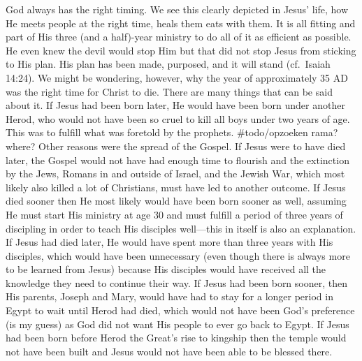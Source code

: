 God always has the right timing. We see this clearly depicted in Jesus'
life, how He meets people at the right time, heals them eats with them.
It is all fitting and part of His three (and a half)-year ministry to do
all of it as efficient as possible. He even knew the devil would stop
Him but that did not stop Jesus from sticking to His plan. His plan has
been made, purposed, and it will stand (cf.~Isaiah 14:24). We might be
wondering, however, why the year of approximately 35 AD was the right
time for Christ to die. There are many things that can be said about it.
If Jesus had been born later, He would have been born under another
Herod, who would not have been so cruel to kill all boys under two years
of age. This was to fulfill what was foretold by the prophets.
\#todo/opzoeken rama? where? Other reasons were the spread of the
Gospel. If Jesus were to have died later, the Gospel would not have had
enough time to flourish and the extinction by the Jews, Romans in and
outside of Israel, and the Jewish War, which most likely also killed a
lot of Christians, must have led to another outcome. If Jesus died
sooner then He most likely would have been born sooner as well, assuming
He must start His ministry at age 30 and must fulfill a period of three
years of discipling in order to teach His disciples well---this in
itself is also an explanation. If Jesus had died later, He would have
spent more than three years with His disciples, which would have been
unnecessary (even though there is always more to be learned from Jesus)
because His disciples would have received all the knowledge they need to
continue their way. If Jesus had been born sooner, then His parents,
Joseph and Mary, would have had to stay for a longer period in Egypt to
wait until Herod had died, which would not have been God's preference
(is my guess) as God did not want His people to ever go back to Egypt.
If Jesus had been born before Herod the Great's rise to kingship then
the temple would not have been built and Jesus would not have been able
to be blessed there.

